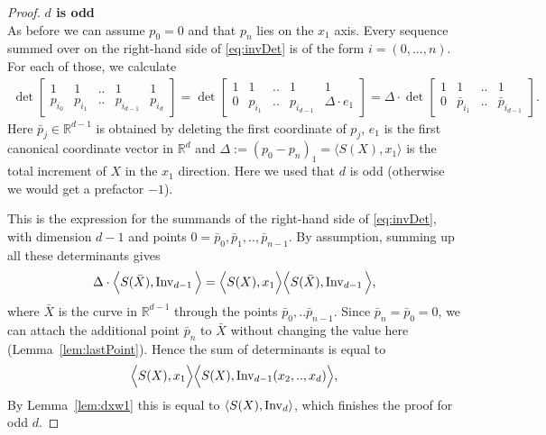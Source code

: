 \documentclass{scrartcl}
\theoremstyle{plain}
\theoremstyle{definition}
\newcommand{\R}{\mathbb{R}}
\newcommand{\1}[1]{1_{\{#1\}}}
\newcommand{\ds}{d} %
\begin{document}
\begin{proof}
  \textbf{$\ds$ is odd }\\
  As before we can assume $p_0 = 0$ and that $p_n$ lies on the $x_1$ axis.
  Every sequence summed over on the right-hand side of \eqref{eq:invDet}
  is of the form $i = (0,...,n)$.
  For each of those, we calculate
  \begin{align*}
     \det\left[
       \begin{matrix}
         1       & 1       & .. & 1             & 1 \\
         p_{i_0} & p_{i_1} & .. & p_{i_{\ds-1}} & p_{i_\ds}
       \end{matrix}
     \right]
     =
     \det\left[
       \begin{matrix}
         1 & 1       & .. & 1             & 1 \\
         0 & p_{i_1} & .. & p_{i_{\ds-1}} & \Delta \cdot e_1
       \end{matrix}
     \right]
     =
     \Delta \cdot
     \det\left[
       \begin{matrix}
         1 & 1            & .. & 1 \\
         0 & \bar p_{i_1} & .. & \bar p_{i_{\ds-1}}
       \end{matrix}
     \right].
  \end{align*}
  Here $\bar p_j \in \R^{\ds-1}$ is obtained by deleting the first coordinate of $p_j$,
  $e_1$ is the first canonical coordinate vector in $\R^\ds$
  and $\Delta := (p_0 - p_n)_1 = \langle S(X), x_1 \rangle$ is the total increment of $X$ in the $x_1$ direction.
  Here we used that $\ds$ is odd (otherwise we would get a prefactor $-1$).

  This is the expression for the summands of the right-hand side of \eqref{eq:invDet},
  with dimension $\ds -1$ and points $0 = \bar p_0, \bar p_1, .., \bar p_{n-1}$.
  By assumption, summing up all these determinants gives
  \begin{align*}
    \Delta \cdot \Big\langle S(\bar X), \firstInvariant{\ds-1} \Big\rangle
    =
    \Big\langle S(X), x_1 \Big\rangle \Big\langle S(\bar X), \firstInvariant{\ds-1} \Big\rangle,
  \end{align*}
  where $\bar X$ is the curve in $\R^{\ds-1}$ through the points $\bar p_0, .. \bar p_{n-1}$.
  Since $\bar p_n = \bar p_0 = 0$,
  we can attach the additional point $\bar p_n$ to $\bar X$ without changing the value here (Lemma~\ref{lem:lastPoint}).
  Hence the sum of determinants is equal to
  \begin{align*}
    \Big\langle S(X), x_1 \Big\rangle \Big\langle S(X), \firstInvariant{\ds-1}(x_2,..,x_\ds) \Big\rangle,
  \end{align*}
  By Lemma~\ref{lem:dxw1} this is equal to $\langle S(X), \firstInvariant{\ds} \rangle$, which finishes the proof for odd $\ds$.


\end{proof}
\end{document}
